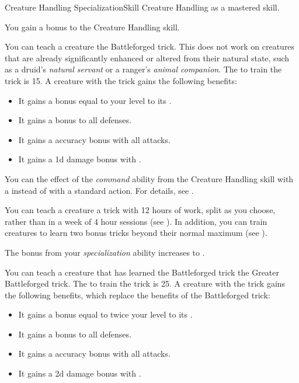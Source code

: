     \begin{feat}{Creature Handling Specialization}{Skill}
        \featpre Creature Handling as a mastered skill.

         You gain a  bonus to the Creature Handling skill.

         You can teach a creature the Battleforged trick.
        This does not work on creatures that are already significantly enhanced or altered from their natural state, such as a druid's \textit{natural servant} or a ranger's \textit{animal companion}.
        The  to train the trick is 15.
        A creature with the trick gains the following benefits:
        \begin{itemize}
            \item It gains a bonus equal to your level to its .
            \item It gains a  bonus to all defenses.
            \item It gains a  accuracy bonus with all attacks.
            \item It gains a \plus1d damage bonus with .
        \end{itemize}

         You can  the effect of the \textit{command} ability from the Creature Handling skill with a  instead of with a standard action.
        For details, see .

         You can teach a creature a trick with 12 hours of work, split as you choose, rather than in a week of 4 hour sessions (see ).
        In addition, you can train creatures to learn two bonus tricks beyond their normal maximum (see ).

         The bonus from your \textit{specialization} ability increases to .

         You can teach a creature that has learned the Battleforged trick the Greater Battleforged trick.
        The  to train the trick is 25.
        A creature with the trick gains the following benefits, which replace the benefits of the Battleforged trick:
        \begin{itemize}
            \item It gains a bonus equal to twice your level to its .
            \item It gains a  bonus to all defenses.
            \item It gains a  accuracy bonus with all attacks.
            \item It gains a \plus2d damage bonus with .
        \end{itemize}


\end{feat}
